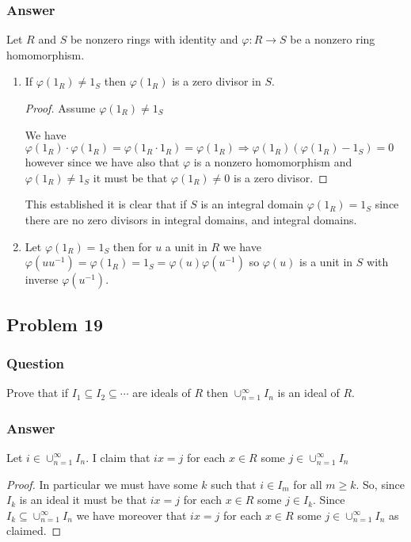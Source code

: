 \documentclass[12pt]{article}
\begin{document}
\subsubsection{Answer}
Let $R$ and $S$ be nonzero rings with identity and $\varphi: R \to S$ be a nonzero ring homomorphism.
\begin{enumerate}
\item If $\varphi(1_R) \neq 1_S$ then $\varphi(1_R)$ is a zero divisor in $S$.
\begin{proof}
Assume $\varphi(1_R) \neq 1_S$

We have $\varphi(1_R)\cdot \varphi(1_R) = \varphi(1_R \cdot 1_R) = \varphi(1_R) \Rightarrow \varphi(1_R) \left( \varphi(1_R) - 1_S\right) = 0$ however since we have also that $\varphi$ is a nonzero homomorphism and $\varphi(1_R)\neq 1_S$ it must be that $\varphi(1_R) \neq 0$ is a zero divisor.
\end{proof}

This established it is clear that if $S$ is an integral domain $\varphi(1_R) = 1_S$ since there are no zero divisors in integral domains, and integral domains.

\item Let $\varphi(1_R)=1_S$ then for  $u$ a unit in $R$ we have $\varphi(u u^{-1}) = \varphi(1_R) = 1_S = \varphi(u) \varphi(u^{-1})$ so $\varphi(u)$ is a unit in $S$ with inverse $\varphi(u^{-1})$.
\end{enumerate}

\subsection{Problem 19}

\subsubsection{Question}
Prove that if $I_1 \subseteq I_2 \subseteq \cdots $ are ideals of $R$ then $\cup_{n=1}^\infty I_n$ is an ideal of $R$.
\subsubsection{Answer}
Let $i \in \cup_{n=1}^\infty I_n$. I claim that $i x  = j $ for each $x \in R$ some $ j \in \cup_{n=1}^\infty I_n$ 
\begin{proof}
In particular we must have some $k$ such that $i \in I_m$ for all $m \geq k$. So, since $I_k$ is an ideal it must be that  $i x  = j $ for each $x \in R$ some $ j \in I_k$. Since $I_k \subseteq \cup_{n=1}^\infty I_n$ we have moreover that  $i x  = j $ for each $x \in R$ some $ j \in \cup_{n=1}^\infty I_n$  as claimed.
\end{proof}
\end{document}
